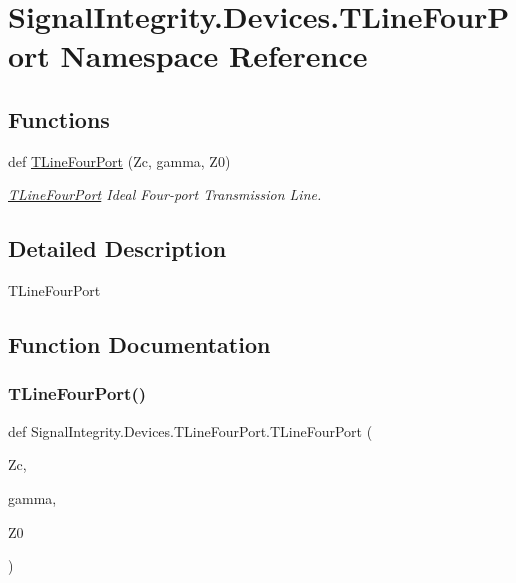 \hypertarget{namespaceSignalIntegrity_1_1Devices_1_1TLineFourPort}{}\section{Signal\+Integrity.\+Devices.\+T\+Line\+Four\+Port Namespace Reference}
\label{namespaceSignalIntegrity_1_1Devices_1_1TLineFourPort}
\subsection*{Functions}
\begin{DoxyCompactItemize}
\item 
def \hyperlink{namespaceSignalIntegrity_1_1Devices_1_1TLineFourPort_a9068bc032d12fa66cf6a8526f3b6d8ff}{T\+Line\+Four\+Port} (Zc, gamma, Z0)
\begin{DoxyCompactList}\small\item\em \hyperlink{namespaceSignalIntegrity_1_1Devices_1_1TLineFourPort}{T\+Line\+Four\+Port} Ideal Four-\/port Transmission Line. \end{DoxyCompactList}\end{DoxyCompactItemize}


\subsection{Detailed Description}
\begin{DoxyVerb}TLineFourPort\end{DoxyVerb}
 

\subsection{Function Documentation}
\mbox{\label{namespaceSignalIntegrity_1_1Devices_1_1TLineFourPort_a9068bc032d12fa66cf6a8526f3b6d8ff}} 
\subsubsection{\texorpdfstring{T\+Line\+Four\+Port()}{TLineFourPort()}}
{\footnotesize\ttfamily def Signal\+Integrity.\+Devices.\+T\+Line\+Four\+Port.\+T\+Line\+Four\+Port (\begin{DoxyParamCaption}\item[{}]{Zc,  }\item[{}]{gamma,  }\item[{}]{Z0 }\end{DoxyParamCaption})}



